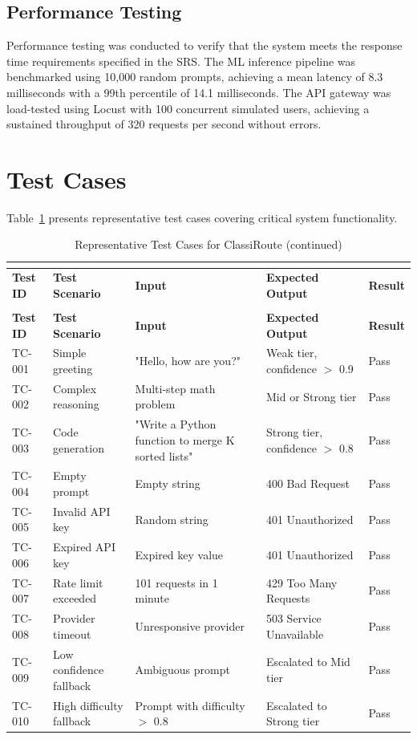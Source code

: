 \documentclass[oneside,12pt,a4paper]{report}
\begin{document}
\subsection{Performance Testing}

Performance testing was conducted to verify that the system meets the response time requirements specified in the SRS. The ML inference pipeline was benchmarked using 10,000 random prompts, achieving a mean latency of 8.3 milliseconds with a 99th percentile of 14.1 milliseconds. The API gateway was load-tested using Locust with 100 concurrent simulated users, achieving a sustained throughput of 320 requests per second without errors.

\section{Test Cases}

Table~\ref{tab:test_cases} presents representative test cases covering critical system functionality.

\begin{longtable}{p{2cm}p{3cm}p{3cm}p{3cm}p{3cm}}
  \caption{Representative Test Cases for ClassiRoute} \\
  \label{tab:test_cases} \\
  \toprule
  \textbf{Test ID} & \textbf{Test Scenario} & \textbf{Input} & \textbf{Expected Output} & \textbf{Result} \\
  \midrule
  \endfirsthead
  \caption[]{Representative Test Cases for ClassiRoute (continued)} \\
  \toprule
  \textbf{Test ID} & \textbf{Test Scenario} & \textbf{Input} & \textbf{Expected Output} & \textbf{Result} \\
  \midrule
  \endhead
  \bottomrule
  \endfoot
  \endlastfoot
  
  TC-001 & Simple greeting & "Hello, how are you?" & Weak tier, confidence $>$ 0.9 & Pass \\
  TC-002 & Complex reasoning & Multi-step math problem & Mid or Strong tier & Pass \\
  TC-003 & Code generation & "Write a Python function to merge K sorted lists" & Strong tier, confidence $>$ 0.8 & Pass \\
  TC-004 & Empty prompt & Empty string & 400 Bad Request & Pass \\
  TC-005 & Invalid API key & Random string & 401 Unauthorized & Pass \\
  TC-006 & Expired API key & Expired key value & 401 Unauthorized & Pass \\
  TC-007 & Rate limit exceeded & 101 requests in 1 minute & 429 Too Many Requests & Pass \\
  TC-008 & Provider timeout & Unresponsive provider & 503 Service Unavailable & Pass \\
  TC-009 & Low confidence fallback & Ambiguous prompt & Escalated to Mid tier & Pass \\
  TC-010 & High difficulty fallback & Prompt with difficulty $>$ 0.8 & Escalated to Strong tier & Pass \\
  
\end{longtable}
\end{document}
